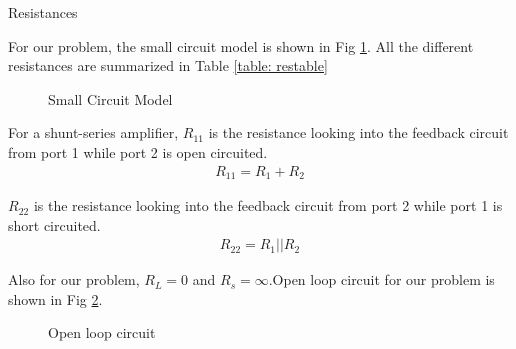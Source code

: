 \begin{enumerate}[label=\arabic*.,ref=\theenumi]
\begin{table}[!ht]
\centering

\caption{Resistances}
\label{table: restable}
\end{table}

For our problem, the small circuit model is shown in Fig \ref{fig:ee18btech11038_smlckt}. All the different resistances are summarized in Table \ref{table: restable}

\begin{figure}[!ht]
	\begin{center}
		
		\resizebox{\columnwidth}{!}{}
	\end{center}
\caption{Small Circuit Model}
\label{fig:ee18btech11038_smlckt}
\end{figure}



For a shunt-series amplifier, $R_{11}$ is the resistance looking into the feedback circuit from port 1 while port 2 is open circuited.
\begin{align}
    R_{11} = R_{1} + R_{2}
\end{align}

$R_{22}$ is the resistance looking into the feedback circuit from port 2 while port 1 is short circuited.
\begin{align}
    R_{22} = R_{1}||R_{2}
\end{align}

Also for our problem, $R_{L} = 0$ and $R_{s} = \infty$.Open loop circuit for our problem is shown in Fig \ref{fig:ee18btech11038_Ackt}.
\begin{figure}[!ht]
	\begin{center}
		
		\resizebox{\columnwidth}{!}{}
	\end{center}
\caption{Open loop circuit}
\label{fig:ee18btech11038_Ackt}
\end{figure}


\end{enumerate}
